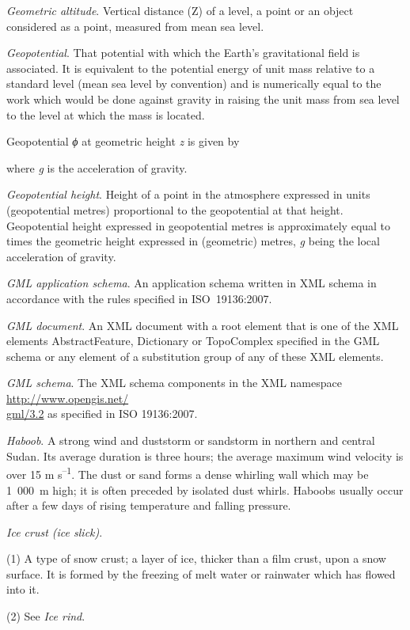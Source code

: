 \emph{Geometric altitude}. Vertical distance (Z) of a level, a point or an object considered as a point, measured from mean sea level.

\emph{Geopotential}. That potential with which the Earth's gravitational field is associated. It is equivalent to the potential energy of unit mass relative to a standard level (mean sea level by convention) and is numerically equal to the work which would be done against gravity in raising the unit mass from sea level to the level at which the mass is located.

Geopotential \emph{ϕ} at geometric height \emph{z} is given by

where \emph{g} is the acceleration of gravity.

\emph{Geopotential height}. Height of a point in the atmosphere expressed in units (geopotential metres) proportional to the geopotential at that height. Geopotential height expressed in geopotential metres is approximately equal to times the geometric height expressed in (geometric) metres, \emph{g} being the local acceleration of gravity.

\emph{GML application schema}. An application schema written in XML schema in accordance with the rules specified in ISO~19136:2007.

\emph{GML document}. An XML document with a root element that is one of the XML elements AbstractFeature, Dictionary or TopoComplex specified in the GML schema or any element of a substitution group of any of these XML elements.

\emph{GML schema}. The XML schema components in the XML namespace \href{http://www.opengis.net/gml/3.2}{http://www.opengis.net/\\
gml/3.2} as specified in ISO 19136:2007.

\emph{Haboob}. A strong wind and duststorm or sandstorm in northern and central Sudan. Its average duration is three hours; the average maximum wind velocity is over 15 m s\textsuperscript{--1}. The dust or sand forms a dense whirling wall which may be 1~000~m high; it is often preceded by isolated dust whirls. Haboobs usually occur after a few days of rising temperature and falling pressure.

\emph{Ice crust (ice slick)}.

(1) A type of snow crust; a layer of ice, thicker than a film crust, upon a snow surface. It is formed by the freezing of melt water or rainwater which has flowed into it.

(2) See \emph{Ice rind}.

